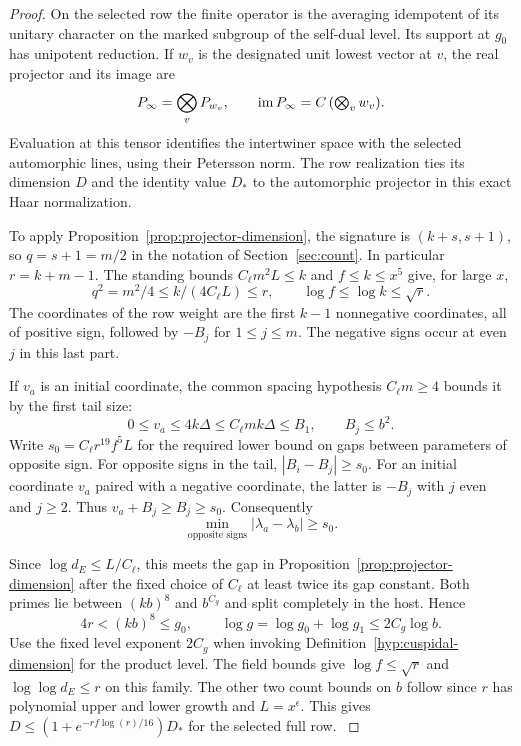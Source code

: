 \begin{proof}

On the selected row the finite operator is the averaging idempotent
of its unitary character on the marked subgroup of the self-dual
level. Its support at \(g_0\) has unipotent reduction. If \(w_v\) is
the designated unit lowest vector at \(v\), the real projector and
its image are
\[
 P_\infty=\bigotimes_v P_{w_v},\qquad
 \operatorname{im}P_\infty=C\,(\textstyle\bigotimes_v w_v).
\] Evaluation at this
tensor identifies the intertwiner space with the selected
automorphic lines, using their Petersson norm. The row realization
ties its dimension \(D\) and the identity value \(D_*\) to the
automorphic projector in this exact Haar normalization.

To apply Proposition~\ref{prop:projector-dimension}, the signature
is \((k+s,s+1)\), so \(q=s+1=m/2\) in the notation of
Section~\ref{sec:count}. In particular \(r=k+m-1\). The standing bounds
\(C_\ell m^2 L\le k\) and \(f\le k\le x^5\) give, for large \(x\),
\[
 q^2=m^2/4\le k/(4C_\ell L)\le r,\qquad
 \log f\le\log k\le\sqrt r .
\] The coordinates of the row weight
are the first \(k-1\) nonnegative coordinates, all of positive
sign, followed by \(-B_j\) for \(1\le j\le m\).
The negative signs occur at even \(j\) in this last part.

If \(v_a\) is an initial coordinate, the common spacing hypothesis
\(C_\ell m\ge4\) bounds it by the first tail size:
\[
 0\le v_a\le4k\Delta\le C_\ell m k\Delta\le B_1,\qquad B_j\le b^2 .
\]
Write \(s_0=C_\ell r^{19}f^5L\) for the required lower bound on gaps between parameters of opposite sign.
For opposite signs in the tail, \(|B_i-B_j|\ge s_0\).
For an initial coordinate \(v_a\) paired with a negative
coordinate, the latter is \(-B_j\) with \(j\) even and
\(j\ge2\). Thus \(v_a+B_j\ge B_j\ge s_0\).
Consequently
\[
 \min_{\text{opposite signs}}|\lambda_a-\lambda_b|\ge s_0 .
\]

Since \(\log d_E\le L/C_\ell\), this meets the gap in
Proposition~\ref{prop:projector-dimension} after the fixed
choice of \(C_\ell\) at least twice its gap constant. Both primes
lie between \((kb)^8\) and \(b^{C_g}\) and split completely in the
host. Hence
\[
 4r<(kb)^8\le g_0,\qquad
 \log g=\log g_0+\log g_1\le 2C_g\log b .
\]
Use the fixed level exponent \(2C_g\) when invoking
Definition~\ref{hyp:cuspidal-dimension} for the product level.
The field bounds give \(\log f\le\sqrt r\) and
\(\log\log d_E\le r\) on this family. The other two
count bounds on \(b\) follow since \(r\) has polynomial upper
and lower growth and \(L=x^\epsilon\). This gives
\(D\le (1+e^{-rf\log(r)/16})D_*\) for the selected full row.
\cite{companion-row-count}\label{cor:selected-row-gram-7}


\end{proof}
